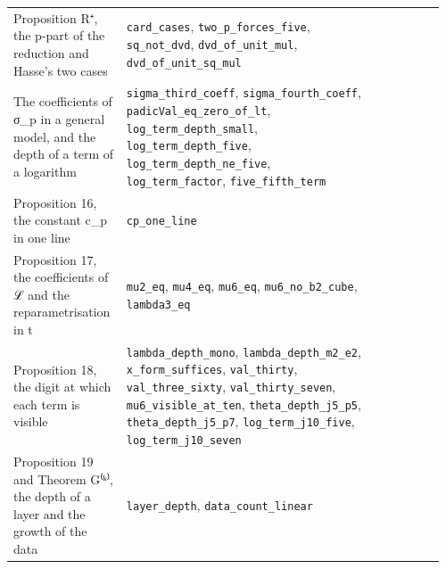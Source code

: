 \documentclass[11pt,a4paper]{article}
\theoremstyle{named}
\begin{document}
\begin{small}
\begin{longtable}{>{\raggedright\arraybackslash}p{0.242\linewidth}>{\raggedright\arraybackslash}p{0.574\linewidth}>{\raggedright\arraybackslash}p{0.143\linewidth}}
Proposition R⁺, the p-part of the reduction and Hasse's two cases & \texttt{card\_\allowbreak{}cases}, \texttt{two\_\allowbreak{}p\_\allowbreak{}forces\_\allowbreak{}five}, \texttt{sq\_\allowbreak{}not\_\allowbreak{}dvd}, \texttt{dvd\_\allowbreak{}of\_\allowbreak{}unit\_\allowbreak{}mul}, \texttt{dvd\_\allowbreak{}of\_\allowbreak{}unit\_\allowbreak{}sq\_\allowbreak{}mul} & 22 \\
The coefficients of σ\_p in a general model, and the depth of a term of a logarithm & \texttt{sigma\_\allowbreak{}third\_\allowbreak{}coeff}, \texttt{sigma\_\allowbreak{}fourth\_\allowbreak{}coeff}, \texttt{padicVal\_\allowbreak{}eq\_\allowbreak{}zero\_\allowbreak{}of\_\allowbreak{}lt}, \texttt{log\_\allowbreak{}term\_\allowbreak{}depth\_\allowbreak{}small}, \texttt{log\_\allowbreak{}term\_\allowbreak{}depth\_\allowbreak{}five}, \texttt{log\_\allowbreak{}term\_\allowbreak{}depth\_\allowbreak{}ne\_\allowbreak{}five}, \texttt{log\_\allowbreak{}term\_\allowbreak{}factor}, \texttt{five\_\allowbreak{}fifth\_\allowbreak{}term} & 22 \\
Proposition 16, the constant c\_p in one line & \texttt{cp\_\allowbreak{}one\_\allowbreak{}line} & 22 \\
Proposition 17, the coefficients of ℒ and the reparametrisation in t & \texttt{mu2\_\allowbreak{}eq}, \texttt{mu4\_\allowbreak{}eq}, \texttt{mu6\_\allowbreak{}eq}, \texttt{mu6\_\allowbreak{}no\_\allowbreak{}b2\_\allowbreak{}cube}, \texttt{lambda3\_\allowbreak{}eq} & 23 \\
Proposition 18, the digit at which each term is visible & \texttt{lambda\_\allowbreak{}depth\_\allowbreak{}mono}, \texttt{lambda\_\allowbreak{}depth\_\allowbreak{}m2\_\allowbreak{}e2}, \texttt{x\_\allowbreak{}form\_\allowbreak{}suffices}, \texttt{val\_\allowbreak{}thirty}, \texttt{val\_\allowbreak{}three\_\allowbreak{}sixty}, \texttt{val\_\allowbreak{}thirty\_\allowbreak{}seven}, \texttt{mu6\_\allowbreak{}visible\_\allowbreak{}at\_\allowbreak{}ten}, \texttt{theta\_\allowbreak{}depth\_\allowbreak{}j5\_\allowbreak{}p5}, \texttt{theta\_\allowbreak{}depth\_\allowbreak{}j5\_\allowbreak{}p7}, \texttt{log\_\allowbreak{}term\_\allowbreak{}j10\_\allowbreak{}five}, \texttt{log\_\allowbreak{}term\_\allowbreak{}j10\_\allowbreak{}seven} & 23 \\
Proposition 19 and Theorem G⁽ᵏ⁾, the depth of a layer and the growth of the data & \texttt{layer\_\allowbreak{}depth}, \texttt{data\_\allowbreak{}count\_\allowbreak{}linear} & 23 \\

\end{longtable}
\end{small}
\end{document}
